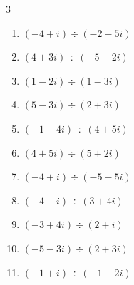 \begin{multicols}{3}
\begin{enumerate}

  \item $\displaystyle (-4+i)\div(-2-5i)$


  \item $\displaystyle (4+3i)\div(-5-2i)$


  \item $\displaystyle (1-2i)\div(1-3i)$


  \item $\displaystyle (5-3i)\div(2+3i)$


  \item $\displaystyle (-1-4i)\div(4+5i)$


  \item $\displaystyle (4+5i)\div(5+2i)$


  \item $\displaystyle (-4+i)\div(-5-5i)$


  \item $\displaystyle (-4-i)\div(3+4i)$


\columnbreak %

\resetques

  \item $\displaystyle (-3+4i)\div(2+i)$


  \item $\displaystyle (-5-3i)\div(2+3i)$


  \item $\displaystyle (-1+i)\div(-1-2i)$


\end{enumerate}
\end{multicols}
